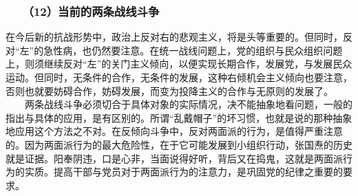 \documentclass[cn,11pt,chinese]{elegantbook}
\def\myformat#1{\hfil\hfil #1}
\begin{document}
\subsubsection*{\myformat{　　（12）当前的两条战线斗争}}
在今后新的抗战形势中，政治上反对右的悲观主义，将是头等重要的。但同时，反对“左”的急性病，也仍然要注意。在统一战线问题上，党的组织与民众组织问题上，则须继续反对“左”的关门主义倾向，以便实现长期合作，发展党，与发展民众运动。但同时，无条件的合作，无条件的发展，这种右倾机会主义倾向也要注意，否则也就要妨碍合作，妨碍发展，而变为投降主义的合作与无原则的发展了。\\
　　两条战线斗争必须切合于具体对象的实际情况，决不能抽象地看问题，一般的指出与具体的应用，是有区别的。所谓“乱戴帽子”的坏习惯，也就是说的那种抽象地应用这个方法之不对。在反倾向斗争中，反对两面派的行为，是值得严重注意的。因为两面派行为的最大危险性，在于它可能发展到小组织行动，张国焘的历史就是证据。阳奉阴违，口是心非，当面说得好听，背后又在捣鬼，这就是两面派行为的实质。提高干部与党员对于两面派行为的注意力，是巩固党的纪律之重要的要求。\\
\end{document}
